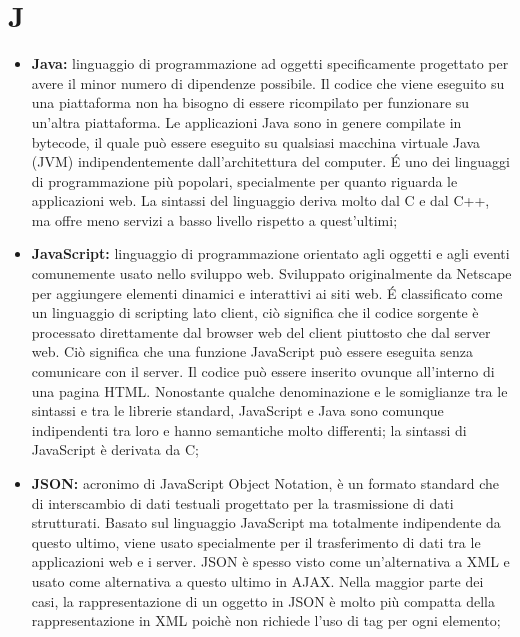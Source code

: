 \section*{J} %
\label{sec:j}
	\begin{itemize}
		\item \textbf{Java:} linguaggio di programmazione ad oggetti specificamente progettato per avere il minor numero di dipendenze possibile. Il codice che viene eseguito su una piattaforma non ha bisogno di essere ricompilato per funzionare su un'altra piattaforma. Le applicazioni Java sono in genere compilate in bytecode, il quale può essere eseguito su qualsiasi macchina virtuale Java (JVM) indipendentemente dall'architettura del computer. É uno dei linguaggi di programmazione più popolari, specialmente per quanto riguarda le applicazioni web. La sintassi del linguaggio deriva molto dal C e dal C++, ma offre meno servizi a basso livello rispetto a quest'ultimi;
		\item \textbf{JavaScript:} linguaggio di programmazione orientato agli oggetti e agli eventi comunemente usato nello sviluppo web. Sviluppato originalmente da Netscape per aggiungere elementi dinamici e interattivi ai siti web. É classificato come un linguaggio di scripting lato client, ciò significa che il codice sorgente è processato direttamente dal browser web del client piuttosto che dal server web. Ciò significa che una funzione JavaScript può essere eseguita senza comunicare con il server. Il codice può essere inserito ovunque all'interno di una pagina HTML. Nonostante qualche denominazione e le somiglianze tra le sintassi e tra le librerie standard, JavaScript e Java sono comunque indipendenti tra loro e hanno semantiche molto differenti; la sintassi di JavaScript è derivata da C;
		\item \textbf{JSON:} acronimo di JavaScript Object Notation, è un formato standard che di interscambio di dati testuali progettato per la trasmissione di dati strutturati. Basato sul linguaggio JavaScript ma totalmente indipendente da questo ultimo, viene usato specialmente per il trasferimento di dati tra le applicazioni web e i server. JSON è spesso visto come un'alternativa a XML e usato come alternativa a questo ultimo in AJAX. Nella maggior parte dei casi, la rappresentazione di un oggetto in JSON è molto più compatta della rappresentazione in XML poichè non richiede l'uso di tag per ogni elemento;
	\end{itemize}
\pagebreak
